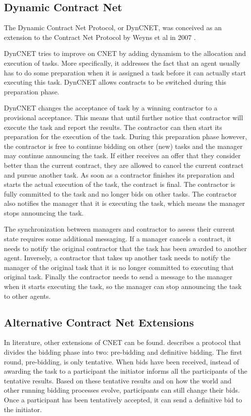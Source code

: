 \documentclass[10pt,a4paper,twocolumn]{article}
\begin{document}
\subsection{Dynamic Contract Net}
The Dynamic Contract Net Protocol, or DynCNET, was conceived as an extension to the Contract Net Protocol by Weyns et al in 2007 \cite{DynCNET}. 

DynCNET tries to improve on CNET by adding dynamism to the allocation and execution of tasks. More specifically, it addresses the fact that an agent usually has to do some preparation when it is assigned a task before it can actually start executing this task. DynCNET allows contracts to be switched during this preparation phase.

DynCNET changes the acceptance of task by a winning contractor to a provisional acceptance. This means that until further notice that contractor will execute the task and report the results. The contractor can then start its preparation for the execution of the task. During this preparation phase however, the contractor is free to continue bidding on other (new) tasks and the manager may continue announcing the task. If either receives an offer that they consider better than the current contract, they are allowed to cancel the current contract and pursue another task. As soon as a contractor finishes its preparation and starts the actual execution of the task, the contract is final. The contractor is fully committed to the task and no longer bids on other tasks. The contractor also notifies the manager that it is executing the task, which means the manager stops announcing the task.

The synchronization between managers and contractor to assess their current state requires some additional messaging. If a manager cancels a contract, it needs to notify the original contractor that the task has been awarded to another agent. Inversely, a contractor that takes up another task needs to notify the manager of the original task that it is no longer committed to executing that original task. Finally the contractor needs to send a message to the manager when it starts executing the task, so the manager can stop announcing the task to other agents.

\subsection{Alternative Contract Net Extensions}
In literature, other extensions of CNET can be found. \cite{TentativeBidding} describes a protocol that divides the bidding phase into two: pre-bidding and definitive bidding. The first round, pre-bidding, is only tentative. When bids have been received, instead of awarding the task to a participant the initiator informs all the participants of the tentative results. Based on these tentative results and on how the world and other running bidding processes evolve, participants can still change their bids. Once a participant has been tentatively accepted, it can send a definitive bid to the initiator.
\end{document}
